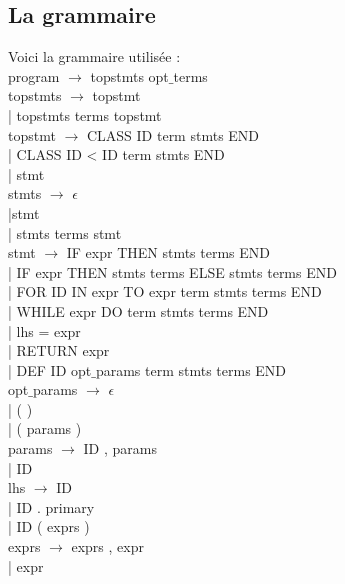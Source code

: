 \documentclass{article}
\begin{document}
\subsection{La grammaire}
Voici la grammaire utilisée : \\

\noindent program $\rightarrow$ topstmts opt$\_$terms \\

\noindent topstmts $\rightarrow$ topstmt \\
       \hspace{1cm}  | topstmts terms topstmt \\

\noindent topstmt $\rightarrow$ CLASS ID term stmts END \\
| CLASS ID < ID term stmts END \\
| stmt \\

\noindent stmts $\rightarrow$ $\epsilon$ \\
|stmt \\
| stmts terms stmt \\

\noindent stmt $\rightarrow$ IF expr THEN stmts terms END \\
| IF expr THEN stmts terms ELSE stmts terms END \\
| FOR ID IN expr TO expr term stmts terms END \\
| WHILE expr DO term stmts terms END \\
| lhs = expr \\
| RETURN expr \\
| DEF ID opt$\_$params term stmts terms END \\

\noindent opt$\_$params $\rightarrow$ $\epsilon$ \\
| ( ) \\
| ( params ) \\

\noindent params $\rightarrow$ ID , params \\
| ID \\

\noindent lhs $\rightarrow$ ID \\
| ID . primary \\
| ID ( exprs ) \\

\noindent exprs $\rightarrow$ exprs , expr \\
| expr \\
\end{document}
